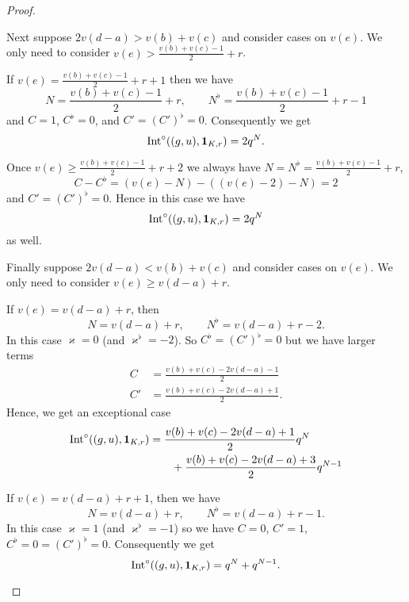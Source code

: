 \begin{proof}
\begin{itemize}
    \ii Next suppose $2v(d-a) > v(b) + v(c)$ and consider cases on $v(e)$.
    We only need to consider $v(e) > \frac{v(b)+v(c)-1}{2} + r$.
    \begin{itemize}
      \ii If $v(e) = \frac{v(b)+v(c)-1}{2} + r + 1$
      then we have
      \[ N = \frac{v(b)+v(c)-1}{2} + r, \qquad N^\flat = \frac{v(b)+v(c)-1}{2} + r - 1 \]
      and
      $C = 1$, $C^\flat = 0$, and $C' = (C')^\flat = 0$.
      Consequently we get
      \[ \operatorname{Int}^\circ((g,u), \mathbf{1}_{K, r}) = 2 q^N. \]

      \ii Once $v(e) \ge \frac{v(b)+v(c)-1}{2} + r + 2$
      we always have $N = N^\flat = \frac{v(b)+v(c)-1}{2} + r$,
      \[ C - C^\flat = (v(e)-N)-((v(e)-2)-N) = 2 \]
      and $C' = (C')^\flat = 0$.
      Hence in this case we have
      \[ \operatorname{Int}^\circ((g,u), \mathbf{1}_{K, r}) = 2 q^N \]
      as well.
    \end{itemize}

    \ii Finally suppose $2v(d-a) < v(b) + v(c)$ and consider cases on $v(e)$.
    We only need to consider $v(e) \ge v(d-a) + r$.
    \begin{itemize}
      \ii If $v(e) = v(d-a) + r$,
      then \[ N = v(d-a) + r, \qquad N^\flat = v(d-a) + r - 2. \]
      In this case $\varkappa = 0$ (and $\varkappa^\flat=-2$).
      So $C^\flat = (C')^\flat = 0$ but we have larger terms
      \begin{align*}
        C &= \frac{v(b) + v(c)- 2v(d-a) - 1}{2} \\
        C' &= \frac{v(b) + v(c)- 2v(d-a) + 1}{2}.
      \end{align*}
      Hence, we get an exceptional case
      \begin{align*}
        \operatorname{Int}^\circ((g,u), \mathbf{1}_{K, r})
        &= \frac{v(b) + v(c) - 2v(d-a) + 1}{2} q^{N} \\
        &\qquad+ \frac{v(b) + v(c) - 2v(d-a) + 3}{2} q^{N-1}
      \end{align*}

      \ii If $v(e) = v(d-a) + r + 1$,
      then we have
      \[ N = v(d-a) + r, \qquad N^\flat = v(d-a) + r - 1. \]
      In this case $\varkappa = 1$ (and $\varkappa^\flat=-1$) so we have
      $C = 0$, $C' = 1$, $C^\flat = 0 = (C')^\flat = 0$.
      Consequently we get
      \[ \operatorname{Int}^\circ((g,u), \mathbf{1}_{K, r}) = q^{N} + q^{N-1}. \]


\end{itemize}
\end{itemize}
\end{proof}
